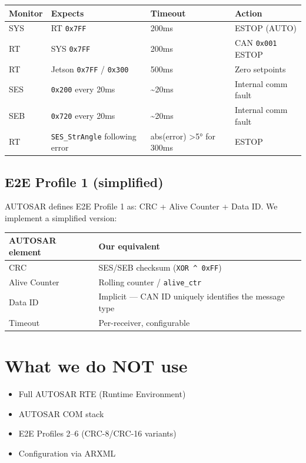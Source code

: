 \documentclass[12pt,a4paper,oneside]{report}
\providecommand{\tightlist}{\setlength{\itemsep}{0pt}\setlength{\parskip}{0pt}}
\begin{document}
\begin{longtable}[]{@{}llll@{}}
\toprule\noalign{}
Monitor & Expects & Timeout & Action \\
\midrule\noalign{}
\endhead
\bottomrule\noalign{}
\endlastfoot
SYS & RT \texttt{0x7FF} & 200ms & ESTOP (AUTO) \\
RT & SYS \texttt{0x7FF} & 200ms & CAN \texttt{0x001} ESTOP \\
RT & Jetson \texttt{0x7FF} / \texttt{0x300} & 500ms & Zero setpoints \\
SES & \texttt{0x200} every 20ms & \textasciitilde20ms & Internal comm fault \\
SEB & \texttt{0x720} every 20ms & \textasciitilde20ms & Internal comm fault \\
RT & \texttt{SES\_StrAngle} following error & abs(error) \textgreater5° for
300ms & ESTOP \\
\end{longtable}

\subsection{E2E Profile 1 (simplified)}\label{e2e-profile-1-simplified}

AUTOSAR defines E2E Profile 1 as: CRC + Alive Counter + Data ID. We implement a
simplified version:

\begin{longtable}[]{@{}ll@{}}
\toprule\noalign{}
AUTOSAR element & Our equivalent \\
\midrule\noalign{}
\endhead
\bottomrule\noalign{}
\endlastfoot
CRC & SES/SEB checksum (\texttt{XOR\ \^{}\ 0xFF}) \\
Alive Counter & Rolling counter / \texttt{alive\_ctr} \\
Data ID & Implicit --- CAN ID uniquely identifies the message type \\
Timeout & Per-receiver, configurable \\
\end{longtable}

\section{What we do NOT use}\label{what-we-do-not-use}

\begin{itemize}
\tightlist
\item
  Full AUTOSAR RTE (Runtime Environment)
\item
  AUTOSAR COM stack
\item
  E2E Profiles 2--6 (CRC-8/CRC-16 variants)
\item
  Configuration via ARXML
\end{itemize}
\end{document}
